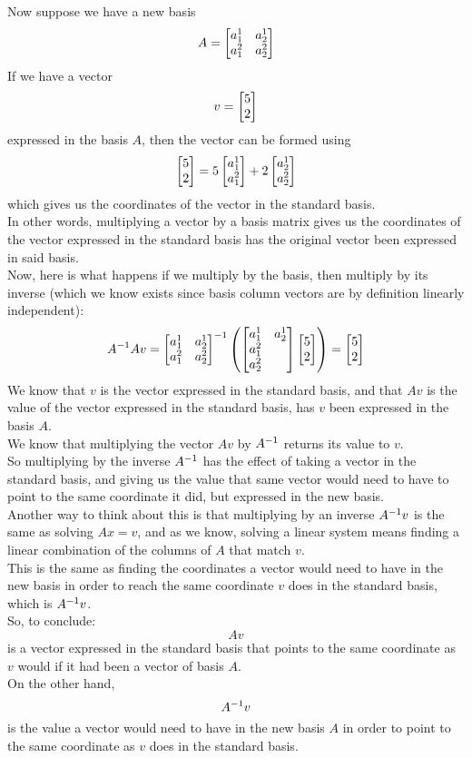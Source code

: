 \documentclass[12pt]{article}
\begin{document}
Now suppose we have a new basis
\[ A = \begin{bmatrix} {a_1^1} & {a_2^1} \\ {a_1^2} & {a_2^2} \end{bmatrix} \]
If we have a vector 
\[ v = \begin{bmatrix} {5}\\{2} \end{bmatrix} \]
expressed in the basis $A$,
then the vector can be formed using
\[ \begin{bmatrix} {5}\\{2} \end{bmatrix} = 5 \begin{bmatrix} {a_1^1}\\{a_1^2} \end{bmatrix}
+ 2 \begin{bmatrix} {a_2^1}\\{a_2^2} \end{bmatrix} \]
which gives us the coordinates of the 
vector in the standard basis. \\
In other words, multiplying a vector
by a basis matrix
gives us the coordinates of the vector
expressed in the standard basis
has the original vector been
expressed in said basis. \\

Now, here is what happens if we multiply by 
the basis, then multiply by its inverse 
(which we know exists since basis column vectors
are by definition linearly independent):
\[ A^{-1} Av = 
\begin{bmatrix} {a_1^1} & {a_2^1} \\{a_1^2}& {a_2^2} \end{bmatrix} ^{-1}
\left( \begin{bmatrix} {a_1^1} & {a_2^1} \\ {a_1^2} \\ {a_2^2} \end{bmatrix}
\begin{bmatrix} {5}\\{2} \end{bmatrix} \right)
= \begin{bmatrix} {5}\\{2} \end{bmatrix} \]
We know that $v$ is the vector
expressed in the standard basis,
and that $Av$ is the value of the vector
expressed in the standard basis,
has $v$ been expressed in the basis $A$. \\
We know that multiplying the vector $Av$ by $A^{-1}$
returns its value to $v$. \\ 
So multiplying by the inverse $A^{-1}$
has the effect of taking a vector
in the standard basis,
and giving us the value that same vector
would need to have to point to the same coordinate
it did, but expressed in the new basis. \\

Another way to think about this is that
multiplying by an inverse $A^{-1} v$
is the same as solving $Ax = v$,
and as we know,
solving a linear system
means finding a linear combination 
of the columns of $A$ that match $v$. \\
This is the same as finding the coordinates
a vector would need to have in the new basis
in order to reach the same coordinate $v$
does in the standard basis, which is $A^{-1} v$. \\

So, to conclude:
\[ Av \]
is a vector expressed in the standard basis
that points to the same coordinate as $v$
would if it had been a vector of basis $A$. \\
On the other hand,
\[ A^{-1} v \]
is the value a vector would need to have
in the new basis $A$ in order to point to the same
coordinate as $v$ does in the standard basis. \\
\end{document}
